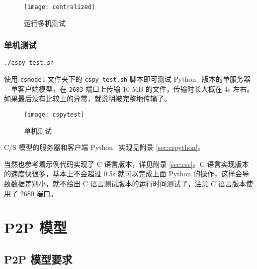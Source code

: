 \begin{figure}[H]
    \centering
    \texttt{[image: centralized]}
    \caption{运行多机测试}\label{fig:csmodeltest}
\end{figure}

\subsubsection{单机测试}

\begin{lstlisting}[style=commandshell]
./cspy_test.sh
\end{lstlisting}
 
使用 \verb"csmodel" 文件夹下的 \verb"cspy_test.sh" 脚本即可测试 Python \faPython\ 版本的单服务器---单客户端模型，在 \verb"2683" 端口上传输 10 MB 的文件，传输时长大概在 4s 左右。如果最后没有比较上的异常，就说明被完整地传输了。

\begin{figure}[H]
    \centering
    \texttt{[image: cspytest]}
    \caption{单机测试}
\end{figure}


C/S 模型的服务器和客户端 Python \faPython\ 实现见附录 \ref{sec:cspython}。

当然也参考着示例代码实现了 C 语言版本，详见附录 \ref{sec:csc}。C 语言实现版本的速度快很多，基本上不会超过 0.5s 就可以完成上面 Python 的操作，这样会导致数据差别小，就不给出 C 语言测试版本的运行时间测试了，注意 C 语言版本使用了 2680 端口。

\section{P2P 模型}

\subsection{P2P 模型要求}

